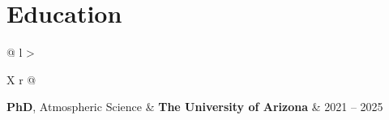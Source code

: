 \documentclass[margin,line]{resume}
\begin{document}
\begin{resume}
{		}
		
		\vspace*{-3mm}
		
		
		
%		
%		
%		

\section{\mysidestyle \textbf{\textcolor{sep}{Education}}}
\begin{tabularx}{\linewidth}{@{} l >{\raggedright\arraybackslash}X r @{}}
	\textbf{PhD}, Atmospheric Science & \textbf{The University of Arizona} & 2021 -- 2025 \\
	 \\[1.5ex]
	

\end{tabularx}
\end{resume}
\end{document}
